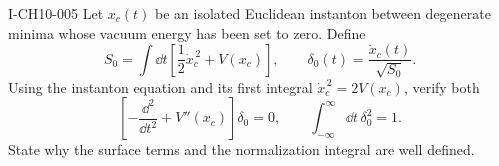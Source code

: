 \begin{exercise}{I-CH10-005}
Let $x_c(t)$ be an isolated Euclidean instanton between degenerate minima whose
vacuum energy has been set to zero.  Define
\[
  S_0=\int\dd t\left[\frac12\dot x_c^{\,2}+V(x_c)\right],
  \qquad
  \delta_0(t)=\frac{\dot x_c(t)}{\sqrt{S_0}}.
\]
Using the instanton equation and its first integral
$\dot x_c^{\,2}=2V(x_c)$, verify both
\[
  \left[-\frac{\dd^2}{\dd t^2}+V''(x_c)\right]\delta_0=0,
  \qquad
  \int_{-\infty}^{\infty}\dd t\,\delta_0^2=1.
\]
State why the surface terms and the normalization integral are well defined.
\end{exercise}
